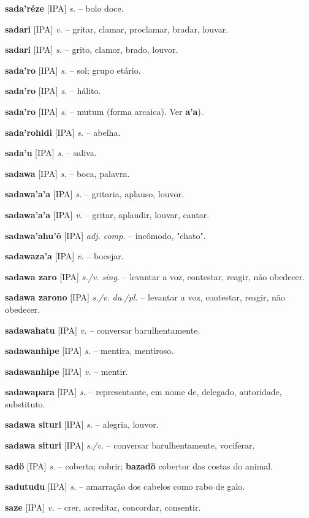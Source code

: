 \textbf{sada'réze} [IPA] \textit{s.} -- bolo doce.

\textbf{sadari} [IPA] \textit{v.} -- gritar, clamar, proclamar, bradar, louvar.

\textbf{sadari} [IPA] \textit{s.} -- grito, clamor, brado, louvor.

\textbf{sada'ro} [IPA] \textit{s.} -- sol; grupo etário.

\textbf{sada'ro} [IPA] \textit{s.} -- hálito.

\textbf{sada'ro} [IPA] \textit{s.} -- mutum (forma arcaica). Ver \textbf{a'a}).

\textbf{sada'rohidi} [IPA] \textit{s.} -- abelha.

\textbf{sada'u} [IPA] \textit{s.} -- saliva.

\textbf{sadawa} [IPA] \textit{s.} -- boca, palavra.

\textbf{sadawa'a'a} [IPA] \textit{s.} -- gritaria, aplauso, louvor.

\textbf{sadawa'a'a} [IPA] \textit{v.} -- gritar, aplaudir, louvar, cantar.

\textbf{sadawa'ahu'õ} [IPA] \textit{adj. comp.} -- incômodo, "chato".

\textbf{sadawaza'a} [IPA] \textit{v.} -- bocejar.

\textbf{sadawa zaro} [IPA] \textit{s./v. sing.} -- levantar a voz, contestar, reagir, não obedecer.

\textbf{sadawa zarono} [IPA] \textit{s./v. du./pl.} -- levantar a voz, contestar, reagir, não obedecer.

\textbf{sadawahatu} [IPA] \textit{v.} -- conversar barulhentamente.

\textbf{sadawanhipe} [IPA] \textit{s.} -- mentira, mentiroso.

\textbf{sadawanhipe} [IPA] \textit{v.} -- mentir.

\textbf{sadawapara} [IPA] \textit{s.} -- representante, em nome de, delegado, autoridade, substituto.

\textbf{sadawa situri} [IPA] \textit{s.} -- alegria, louvor.

\textbf{sadawa situri} [IPA] \textit{s./v.} -- conversar barulhentamente, vociferar.

\textbf{sadö} [IPA] \textit{s.} -- coberta; cobrir; \textbf{bazadö} cobertor das costas do animal.

\textbf{sadutudu} [IPA] \textit{s.} -- amarração dos cabelos como rabo de galo.

\textbf{saze} [IPA] \textit{v.} -- crer, acreditar, concordar, consentir.

